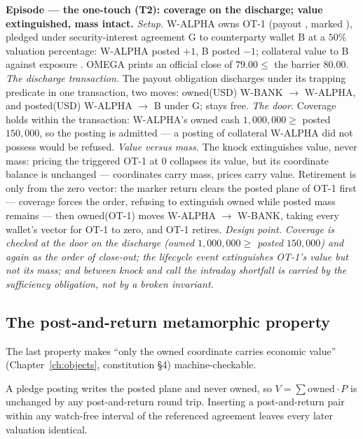 \medskip\noindent\textbf{Episode --- the one-touch (T2): coverage on the
discharge; value extinguished, mass intact.}
\emph{Setup.} W-ALPHA owns OT-1 (payout , marked
), pledged under security-interest agreement G to counterparty
wallet B at a $50\%$ valuation percentage: W-ALPHA posted $+1$, B posted $-1$;
collateral value to B  against exposure . OMEGA
prints an official close of $79.00 \le$ the barrier $80.00$.
\emph{The discharge transaction.} The payout obligation discharges under its
trapping predicate in one transaction, two moves: owned(USD) 
W-BANK $\to$ W-ALPHA, and posted(USD)  W-ALPHA $\to$ B under G;
 stays free.
\emph{The door.} Coverage holds within the transaction: W-ALPHA's owned cash
$1{,}000{,}000 \ge$ posted $150{,}000$, so the posting is admitted --- a posting
of collateral W-ALPHA did not possess would be refused.
\emph{Value versus mass.} The knock extinguishes value, never mass: pricing the
triggered OT-1 at $0$ collapses its value, but its coordinate balance is unchanged
--- coordinates carry mass, prices carry value. Retirement is only from the zero
vector: the marker return clears the posted plane of OT-1 first --- coverage
forces the order, refusing to extinguish owned while posted mass remains --- then
owned(OT-1) moves W-ALPHA $\to$ W-BANK, taking every wallet's vector for OT-1 to
zero, and OT-1 retires.
\emph{Design point.} \emph{Coverage is checked at the door on the discharge
(owned $1{,}000{,}000 \ge$ posted $150{,}000$) and again as the order of close-out;
the lifecycle event extinguishes OT-1's value but not its mass; and between knock
and call the intraday shortfall is carried by the sufficiency obligation, not by a
broken invariant.}

\subsection{The post-and-return metamorphic property}

The last property makes ``only the owned coordinate carries economic value''
(Chapter~\ref{ch:objects}, constitution \S 4) machine-checkable.

\begin{proposition}\label{prop:postreturn}
A pledge posting writes the posted plane and never owned, so $V=\sum
\mathrm{owned}\cdot P$ is unchanged by any post-and-return round trip. Inserting a
post-and-return pair within any watch-free interval of the referenced agreement
leaves every later valuation identical.
\end{proposition}

